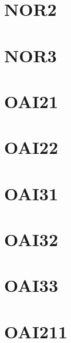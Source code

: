 \documentclass[10pt,a4paper,twoside]{article}
\begin{document}
\section{NOR2}

\clearpage

\section{NOR3}

\clearpage



\section{OAI21}

\clearpage

\section{OAI22}

\clearpage

\section{OAI31}

\clearpage

\section{OAI32}

\clearpage

\section{OAI33}

\clearpage

\section{OAI211}

\clearpage
\end{document}
